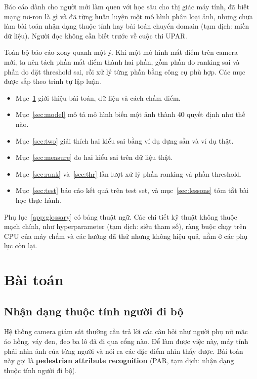 \documentclass[11pt,a4paper]{article}
\begin{document}
Báo cáo dành cho người mới làm quen với học sâu cho thị giác máy tính, đã biết mạng nơ-ron là gì và đã từng huấn luyện một mô hình phân loại ảnh, nhưng chưa làm bài toán nhận dạng thuộc tính hay bài toán chuyển domain (tạm dịch: miền dữ liệu). Người đọc không cần biết trước về cuộc thi UPAR.

Toàn bộ báo cáo xoay quanh một ý. Khi một mô hình mất điểm trên camera mới, ta nên tách phần mất điểm thành hai phần, gồm phần do ranking sai và phần do đặt threshold sai, rồi xử lý từng phần bằng công cụ phù hợp. Các mục được sắp theo trình tự lập luận.

\begin{itemize}[leftmargin=1.4em]
\item Mục~\ref{sec:task} giới thiệu bài toán, dữ liệu và cách chấm điểm.
\item Mục~\ref{sec:model} mô tả mô hình biến một ảnh thành 40 quyết định như thế nào.
\item Mục~\ref{sec:two} giải thích hai kiểu sai bằng ví dụ dựng sẵn và ví dụ thật.
\item Mục~\ref{sec:measure} đo hai kiểu sai trên dữ liệu thật.
\item Mục~\ref{sec:rank} và~\ref{sec:thr} lần lượt xử lý phần ranking và phần threshold.
\item Mục~\ref{sec:test} báo cáo kết quả trên test set, và mục~\ref{sec:lessons} tóm tắt bài học thực hành.
\end{itemize}

Phụ lục~\ref{app:glossary} có bảng thuật ngữ. Các chi tiết kỹ thuật không thuộc mạch chính, như hyperparameter (tạm dịch: siêu tham số), ràng buộc chạy trên CPU của máy chấm và các hướng đã thử nhưng không hiệu quả, nằm ở các phụ lục còn lại.

\section{Bài toán}
\label{sec:task}

\subsection{Nhận dạng thuộc tính người đi bộ}

Hệ thống camera giám sát thường cần trả lời các câu hỏi như người phụ nữ mặc áo hồng, váy đen, đeo ba lô đã đi qua cổng nào. Để làm được việc này, máy tính phải nhìn ảnh của từng người và nói ra các đặc điểm nhìn thấy được. Bài toán này gọi là \textbf{pedestrian attribute recognition} (PAR, tạm dịch: nhận dạng thuộc tính người đi bộ).
\end{document}
